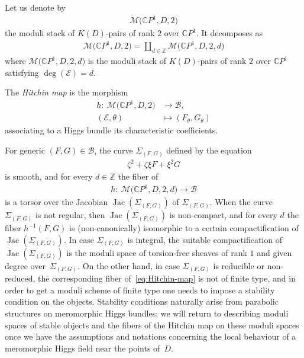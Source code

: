 \documentclass[pdftex]{sigma}
\newcommand{\Z}{{\mathbb Z}} %
\newcommand{\CP}[1]{\mathbb{C}P^{#1}} %
\newcommand{\E}{{\mathcal E}} %
\newcommand{\Mod}{{\mathcal M}} %
\numberwithin{equation}{section}
\begin{document}
Let us denote by
\begin{gather*}
 \Mod \big(\CP1, D, 2\big)
\end{gather*}
the moduli stack of $K(D)$-pairs of rank $2$ over $\CP1$. It decomposes as
\begin{gather*}%
 \Mod \big(\CP1, D, 2\big) = \coprod_{d\in\Z} \Mod \big(\CP1, D, 2, d\big)
\end{gather*}
where $\Mod \big(\CP1, D, 2, d\big)$ is the moduli stack of $K(D)$-pairs of rank $2$ over $\CP1$ satisfying $\deg (\E )\allowbreak = d$.
\begin{defn}\label{def:Hitchin_map}
 The {\it Hitchin map} is the morphism
 \begin{align*}
 h\colon \ \Mod \big(\CP1, D, 2\big) & \to \mathcal{B}, \\
 (\E ,\theta ) & \mapsto (F_{\theta}, G_{\theta})
 \end{align*}
 associating to a Higgs bundle its characteristic coefficients.
\end{defn}
For generic $(F,G) \in \mathcal{B}$, the curve $\Sigma_{(F,G)}$ defined by the equation
\begin{gather*}
 \zeta^2 + \zeta \xi F + \xi^2 G
\end{gather*}
is smooth, and for every $d\in \Z$ the fiber of
\begin{gather}\label{eq:Hitchin-map}
 h\colon \ \Mod \big(\CP1, D, 2, d\big) \to \mathcal{B}
\end{gather}
is a torsor over the Jacobian $\operatorname{Jac} (\Sigma_{(F,G)})$ of
$\Sigma_{(F,G)}$. When the curve $\Sigma_{(F,G)}$ is not regular, then
$\operatorname{Jac} (\Sigma_{(F,G)})$ is non-compact, and for every $d$ the fiber
$h^{-1} (F,G)$ is (non-canonically) isomorphic to a certain compactification
of $\operatorname{Jac} (\Sigma_{(F,G)})$. In case $\Sigma_{(F,G)}$ is integral,
the suitable compactifi\-cation of $\operatorname{Jac} (\Sigma_{(F,G)})$ is the
moduli space of torsion-free sheaves of rank $1$ and given degree over~$\Sigma_{(F,G)}$. On the other hand, in case $\Sigma_{(F,G)}$ is
reducible or non-reduced, the corresponding fiber of~\eqref{eq:Hitchin-map} is not
of finite type, and in order to get a moduli scheme of finite type one
needs to impose a stability condition on the objects. Stability
conditions naturally arise from parabolic structures on meromorphic
Higgs bundles; we will return to describing moduli spaces of stable
objects and the fibers of the Hitchin map on these moduli spaces once
we have the assumptions and notations concerning the local
behaviour of a meromorphic Higgs field near the points of~$D$.
\end{document}
